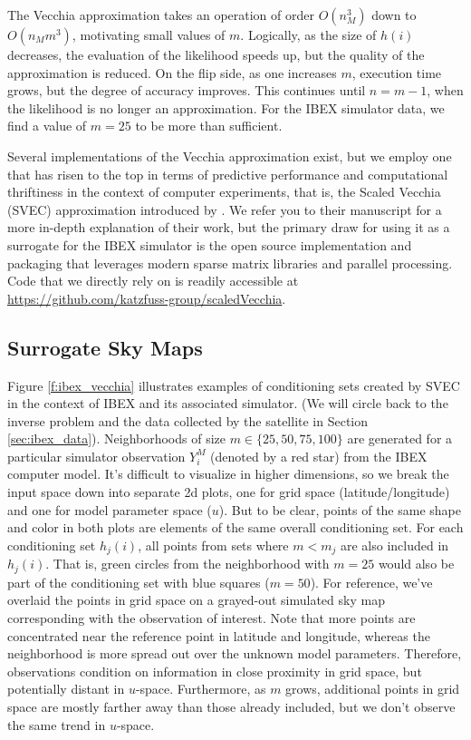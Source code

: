 \documentclass[11pt]{article}
\begin{document}
The Vecchia approximation takes an operation of order $O(n_M^3)$ down to $O(n_M
m^3)$, motivating small values of $m$. Logically, as the size of $h(i)$
decreases, the evaluation of the likelihood speeds up, but the quality of the
approximation is reduced. On the flip side, as one increases $m$, execution
time grows, but the degree of accuracy improves. This continues until $n=m-1$,
when the likelihood is no longer an approximation. For the IBEX simulator data,
we find a value of $m=25$ to be more than sufficient.

Several implementations of the Vecchia approximation exist, but we employ one
that has risen to the top in terms of predictive performance and
computational thriftiness in the context of computer experiments, that is,
the Scaled Vecchia {\color{red}(SVEC)} approximation introduced by \citet
{scaledvecchiakatzfuss2022}. We refer you to their manuscript for a more
in-depth explanation of their work, but the primary draw for using it as a
surrogate for the IBEX simulator is the open source implementation and
packaging that leverages modern sparse matrix libraries and parallel
processing. Code that we directly rely on is readily accessible at
\url{https://github.com/katzfuss-group/scaledVecchia}.

\subsection{Surrogate Sky Maps}
\label{sec:surr_skymaps}

Figure \ref{f:ibex_vecchia} illustrates examples of conditioning sets created
by {\color{red}SVEC} in the context of IBEX and its associated simulator. (We will circle
back to the inverse problem and the data collected by the satellite in
Section \ref{sec:ibex_data}). Neighborhoods of size $m \in
\{25,50,75,100\}$ are generated for a particular simulator observation $Y_i^M$
(denoted by a red star) from the IBEX computer model. It's difficult to
visualize in higher dimensions, so we break the input space down into separate
2d plots, one for grid space (latitude/longitude) and one for model parameter
space ($u$). But to be clear, points of the same shape and color in both plots
are elements of the same overall conditioning set. For each conditioning set
$h_j(i)$, all points from sets where $m < m_j$ are also included in $h_j(i)$.
That is, green circles from the neighborhood with $m=25$ would also be part of
the conditioning set with blue squares ($m=50$). For reference, we've overlaid
the points in grid space on a grayed-out simulated sky map corresponding with
the observation of interest. Note that more points are concentrated near the
reference point in latitude and longitude, whereas the neighborhood is more
spread out over the unknown model parameters. Therefore, observations condition
on information in close proximity in grid space, but potentially distant in
$u$-space. Furthermore, as $m$ grows, additional points in grid space are mostly
farther away than those already included, but we don't observe the same trend in
$u$-space.
\end{document}
